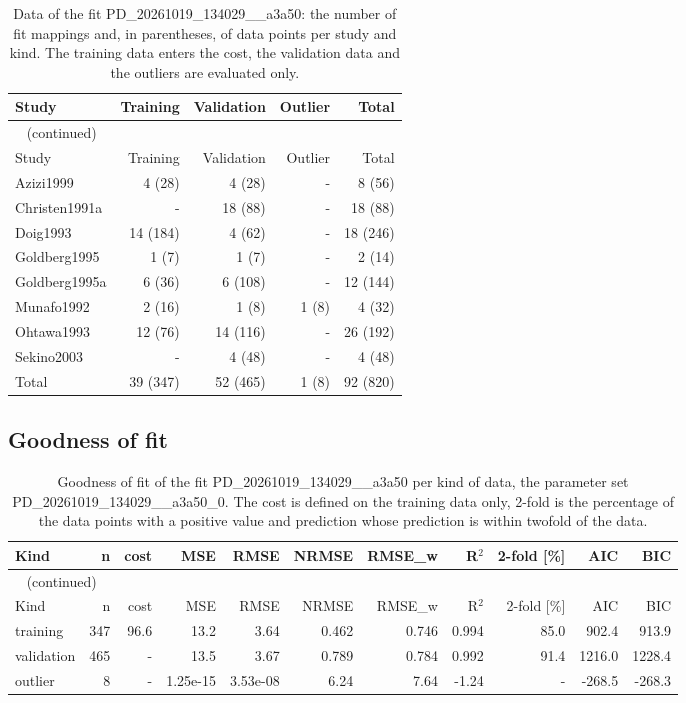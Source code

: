 \begin{longtable}{lrrrr}
\caption{Data of the fit PD\_20261019\_134029\_\_a3a50: the number of fit mappings and, in parentheses, of data points per study and kind. The training data enters the cost, the validation data and the outliers are evaluated only.}\label{tab:data:PD_20261019_134029__a3a50} \\
\toprule
Study & Training & Validation & Outlier & Total \\
\midrule
\endfirsthead
\multicolumn{5}{l}{\small\tablename~\thetable{} (continued)} \\
\toprule
Study & Training & Validation & Outlier & Total \\
\midrule
\endhead
\bottomrule
\endlastfoot
Azizi1999 & 4 (28) & 4 (28) & - & 8 (56) \\
Christen1991a & - & 18 (88) & - & 18 (88) \\
Doig1993 & 14 (184) & 4 (62) & - & 18 (246) \\
Goldberg1995 & 1 (7) & 1 (7) & - & 2 (14) \\
Goldberg1995a & 6 (36) & 6 (108) & - & 12 (144) \\
Munafo1992 & 2 (16) & 1 (8) & 1 (8) & 4 (32) \\
Ohtawa1993 & 12 (76) & 14 (116) & - & 26 (192) \\
Sekino2003 & - & 4 (48) & - & 4 (48) \\
Total & 39 (347) & 52 (465) & 1 (8) & 92 (820) \\
\end{longtable}

\subsection{Goodness of fit}

\begin{longtable}{lrrrrrrrrrr}
\caption{Goodness of fit of the fit PD\_20261019\_134029\_\_a3a50 per kind of data, the parameter set PD\_20261019\_134029\_\_a3a50\_0. The cost is defined on the training data only, 2-fold is the percentage of the data points with a positive value and prediction whose prediction is within twofold of the data.}\label{tab:metrics:PD_20261019_134029__a3a50} \\
\toprule
Kind & n & cost & MSE & RMSE & NRMSE & RMSE\_w & R\ensuremath{^{2}} & 2-fold [\%] & AIC & BIC \\
\midrule
\endfirsthead
\multicolumn{11}{l}{\small\tablename~\thetable{} (continued)} \\
\toprule
Kind & n & cost & MSE & RMSE & NRMSE & RMSE\_w & R\ensuremath{^{2}} & 2-fold [\%] & AIC & BIC \\
\midrule
\endhead
\bottomrule
\endlastfoot
training & 347 & 96.6 & 13.2 & 3.64 & 0.462 & 0.746 & 0.994 & 85.0 & 902.4 & 913.9 \\
validation & 465 & - & 13.5 & 3.67 & 0.789 & 0.784 & 0.992 & 91.4 & 1216.0 & 1228.4 \\
outlier & 8 & - & 1.25e-15 & 3.53e-08 & 6.24 & 7.64 & -1.24 & - & -268.5 & -268.3 \\
\end{longtable}

